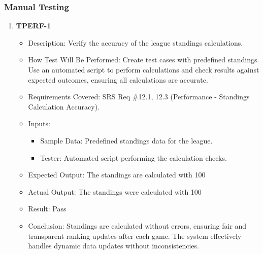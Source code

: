 \documentclass[12pt, titlepage]{article}
\begin{document}
\subsubsection{Manual Testing}
\begin{enumerate}
    \item \textbf{TPERF-1}  
        \begin{itemize}
            \item Description: Verify the accuracy of the league standings calculations.
            \item How Test Will Be Performed: Create test cases with predefined standings. Use an automated script to perform calculations and check results against expected outcomes, ensuring all calculations are accurate.
            \item Requirements Covered: SRS Req \#12.1, 12.3 (Performance - Standings Calculation Accuracy).
            \item Inputs:  
                \begin{itemize}
                    \item Sample Data: Predefined standings data for the league.
                    \item Tester: Automated script performing the calculation checks.
                \end{itemize}
            \item Expected Output: The standings are calculated with 100%
            \item Actual Output: The standings were calculated with 100%
            \item Result: Pass
            \item Conclusion: Standings are calculated without errors, ensuring fair and transparent ranking updates after each game.
			The system effectively handles dynamic data updates without inconsistencies.
        \end{itemize}


\end{enumerate}
\end{document}
